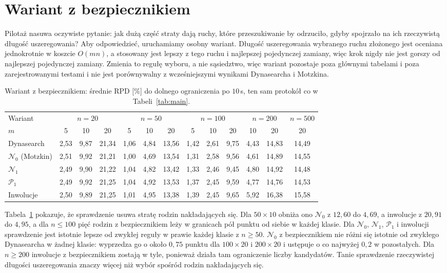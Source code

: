 \documentclass[10pt,twocolumn]{article}
\newcommand{\N}{\mathcal{N}}
\newcommand{\Pa}{\mathcal{P}}
\begin{document}
\section{Wariant z bezpiecznikiem}\label{sec:safe}

Pilotaż nasuwa oczywiste pytanie: jak dużą część straty dają ruchy, które
przeszukiwanie by odrzuciło, gdyby spojrzało na ich rzeczywistą długość
uszeregowania? Aby odpowiedzieć, uruchamiamy osobny wariant. Długość
uszeregowania wybranego ruchu złożonego jest oceniana jednokrotnie
w koszcie $O(mn)$, a stosowany jest lepszy z tego ruchu i najlepszej
pojedynczej zamiany, więc krok nigdy nie jest gorszy od najlepszej
pojedynczej zamiany. Zmienia to regułę wyboru, a nie sąsiedztwo, więc
wariant pozostaje poza głównymi tabelami i poza zarejestrowanymi testami
i nie jest porównywalny z wcześniejszymi wynikami Dynasearcha i Motzkina.

\begin{table}[t]
\centering
\caption{Wariant z bezpiecznikiem: średnie RPD [\%] do dolnego ograniczenia
po $10$\,s, ten sam protokół co w Tabeli~\ref{tab:main}.}
\label{tab:safe}
\small
\begin{tabular}{@{}l*{12}{c}@{}}
\toprule
Wariant & \multicolumn{3}{c}{$n=20$} & \multicolumn{3}{c}{$n=50$} &
\multicolumn{3}{c}{$n=100$} & \multicolumn{2}{c}{$n=200$} & $n=500$ \\
$m$ & 5 & 10 & 20 & 5 & 10 & 20 & 5 & 10 & 20 & 10 & 20 & 20 \\
\midrule
Dynasearch & 2,53 & 9,87 & 21,34 & 1,06 & 4,84 & 13,56 & 1,42 & 2,61 & 9,75 & 4,43 & 14,83 & 14,49 \\
$\N_0$ (Motzkin) & 2,51 & 9,92 & 21,21 & 1,00 & 4,69 & 13,54 & 1,31 & 2,58 & 9,56 & 4,61 & 14,89 & 14,55 \\
$\N_1$ & 2,49 & 9,90 & 21,22 & 1,04 & 4,82 & 13,42 & 1,33 & 2,46 & 9,45 & 4,80 & 14,92 & 14,48 \\
$\Pa_1$ & 2,49 & 9,92 & 21,25 & 1,04 & 4,92 & 13,53 & 1,37 & 2,45 & 9,59 & 4,77 & 14,76 & 14,53 \\
Inwolucje & 2,50 & 9,89 & 21,25 & 1,01 & 4,95 & 13,38 & 1,39 & 2,45 & 9,65 & 5,92 & 16,38 & 15,58 \\
\bottomrule
\end{tabular}
\end{table}

Tabela~\ref{tab:safe} pokazuje, że sprawdzenie usuwa stratę rodzin
nakładających się. Dla $50\times10$ obniża ono $\N_0$ z $12{,}60$ do
$4{,}69$, a inwolucje z $20{,}91$ do $4{,}95$, a dla $n\leq100$ pięć
rodzin z bezpiecznikiem leży w granicach pół punktu od siebie w każdej
klasie. Dla $\N_0$, $\N_1$, $\Pa_1$ i inwolucji sprawdzenie jest istotnie
lepsze od zwykłej reguły w prawie każdej klasie z $n\geq50$. $\N_0$
z bezpiecznikiem nie różni się istotnie od zwykłego Dynasearcha w żadnej
klasie: wyprzedza go o około $0{,}75$ punktu dla $100\times20$
i $200\times20$ i ustępuje o co najwyżej $0{,}2$ w pozostałych.
Dla $n\geq200$ inwolucje z bezpiecznikiem zostają w tyle, ponieważ
działa tam ograniczenie liczby kandydatów. Tanie sprawdzenie rzeczywistej
długości uszeregowania znaczy więcej niż wybór spośród rodzin
nakładających się.
\end{document}
